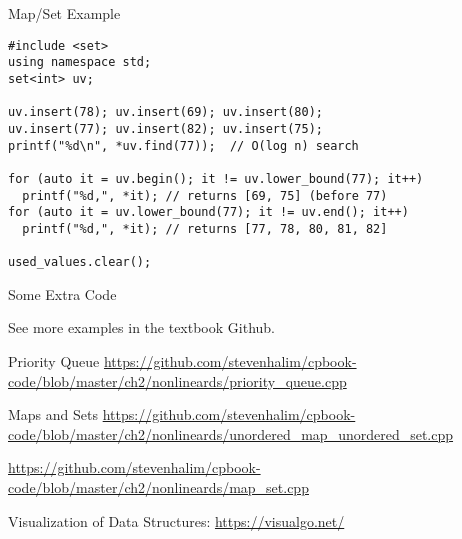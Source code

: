 \begin{frame}[fragile]{Map/Set Example}

{\smal
\begin{verbatim}
#include <set>
using namespace std;
set<int> uv;

uv.insert(78); uv.insert(69); uv.insert(80);
uv.insert(77); uv.insert(82); uv.insert(75);
printf("%d\n", *uv.find(77));  // O(log n) search

for (auto it = uv.begin(); it != uv.lower_bound(77); it++)
  printf("%d,", *it); // returns [69, 75] (before 77)
for (auto it = uv.lower_bound(77); it != uv.end(); it++)
  printf("%d,", *it); // returns [77, 78, 80, 81, 82]

used_values.clear();
\end{verbatim}}
\end{frame}

\begin{frame}{Some Extra Code}

See more examples in the textbook Github.

\begin{block}{Priority Queue}
\url{https://github.com/stevenhalim/cpbook-code/blob/master/ch2/nonlineards/priority_queue.cpp}
\end{block}

\begin{block}{Maps and Sets}
\url{https://github.com/stevenhalim/cpbook-code/blob/master/ch2/nonlineards/unordered_map_unordered_set.cpp}

\url{https://github.com/stevenhalim/cpbook-code/blob/master/ch2/nonlineards/map_set.cpp}
\end{block}

Visualization of Data Structures: 
\url{https://visualgo.net/}
\end{frame}
